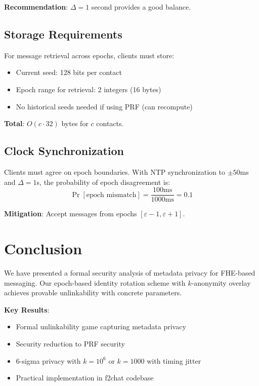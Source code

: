 \documentclass[11pt]{article}
\newcommand{\epoch}{\varepsilon}
\begin{document}
\textbf{Recommendation}: $\Delta = 1$ second provides a good balance.

\subsection{Storage Requirements}

For message retrieval across epochs, clients must store:
\begin{itemize}
    \item Current seed: 128 bits per contact
    \item Epoch range for retrieval: 2 integers (16 bytes)
    \item No historical seeds needed if using PRF (can recompute)
\end{itemize}

\textbf{Total}: $O(c \cdot 32)$ bytes for $c$ contacts.

\subsection{Clock Synchronization}

Clients must agree on epoch boundaries. With NTP synchronization to $\pm 50$ms and
$\Delta = 1$s, the probability of epoch disagreement is:
\[
\Pr[\text{epoch mismatch}] = \frac{100\text{ms}}{1000\text{ms}} = 0.1
\]

\textbf{Mitigation}: Accept messages from epochs $[\epoch - 1, \epoch + 1]$.

\section{Conclusion}

We have presented a formal security analysis of metadata privacy for FHE-based
messaging. Our epoch-based identity rotation scheme with $k$-anonymity overlay
achieves provable unlinkability with concrete parameters.

\textbf{Key Results}:
\begin{itemize}
    \item Formal unlinkability game capturing metadata privacy
    \item Security reduction to PRF security
    \item 6-sigma privacy with $k = 10^6$ or $k = 1000$ with timing jitter
    \item Practical implementation in f2chat codebase
\end{itemize}
\end{document}
